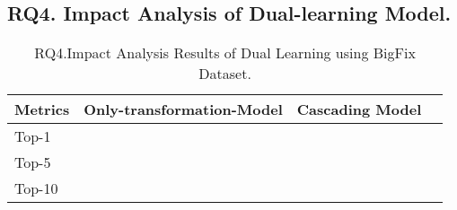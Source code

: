 \subsection{\bf RQ4. Impact Analysis of Dual-learning Model.}



\begin{table}[t]
	\caption{RQ4.Impact Analysis Results of Dual Learning using BigFix Dataset.}
	{\small
		\begin{center}
			\renewcommand{\arraystretch}{1}
			\begin{tabular}{p{1.35cm}<{\centering}|p{2.4cm}<{\centering}|p{1.7cm}<{\centering}|p{1.2cm}<{\centering}}
				\hline
				Metrics & Only-transformation-Model & Cascading Model &  \tool \\			
				\hline
				Top-1   &  &  &  \\
				Top-5	&  &  & \\
				Top-10	&  &  & \\
			
				\hline
			\end{tabular}
			
			\label{fig:rq2-1}
		\end{center}
	}
\end{table}